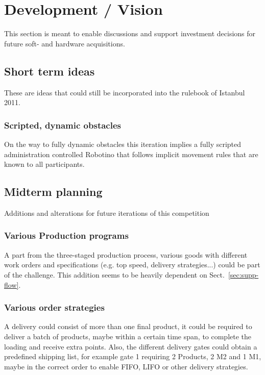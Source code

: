 \documentclass[12pt,twoside]{article}
\begin{document}


\section{Development / Vision}

This section is meant to enable discussions and support investment
decisions for future soft- and hardware acquisitions.

\subsection{Short term ideas}

These are ideas that could still be incorporated into the rulebook of
Istanbul 2011. 

\subsubsection{Scripted, dynamic obstacles}

On the way to fully dynamic obstacles this iteration implies a fully
scripted administration controlled Robotino that follows implicit
movement rules that are known to all participants.

\subsection{Midterm planning}
Additions and alterations for future iterations of this competition


\subsubsection{Various Production programs}
A part from the three-staged production process, various goods with
different work orders and specifications (e.g. top speed, delivery
strategies...) could be part of the challenge. This addition seems to
be heavily dependent on Sect.~\ref{sec:supp-flow}.

\subsubsection{Various order strategies}
A delivery could consist of more than one final product, it could be
required to deliver a batch of products, maybe within a certain time
span, to complete the loading and receive extra points. Also, the
different delivery gates could obtain a predefined shipping list, for
example gate 1 requiring 2 Products, 2 M2 and 1 M1, maybe in the
correct order to enable FIFO, LIFO or other delivery strategies.
\end{document}
